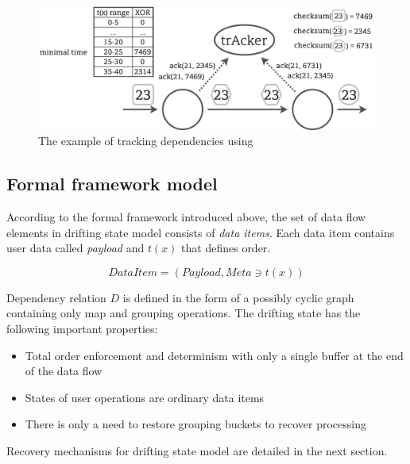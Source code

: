 \begin{figure}[htbp]
  \centering
  \includegraphics[width=\columnwidth]{pics/acker}
  \caption{The example of tracking dependencies using~\Acker\ }
  \label {acker}
\end{figure}

\subsection{Formal framework model}

According to the formal framework introduced above, the set of data flow elements in drifting state model consists of {\em data items}. Each data item contains user data called {\em payload} and $t(x)$ that defines order.

$$DataItem=(Payload,Meta \ni t(x))$$

Dependency relation $D$ is defined in the form of a possibly cyclic graph containing only map and grouping operations. The drifting state has the following important properties:

\begin{itemize}
    \item Total order enforcement and determinism with only a single buffer at the end of the data flow
    \item States of user operations are ordinary data items
    \item There is only a need to restore grouping buckets to recover processing 
\end{itemize}

Recovery mechanisms for drifting state model are detailed in the next section.